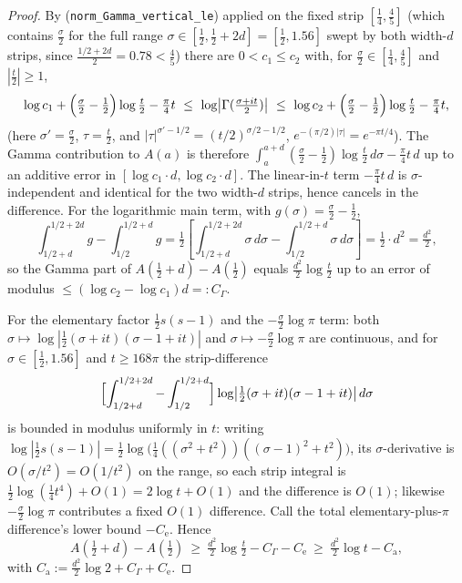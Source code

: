 \begin{proof}
\leanok
{}
By  (\texttt{norm\_Gamma\_vertical\_le}) applied on the
fixed strip $[\tfrac14,\tfrac45]$ (which contains $\tfrac\sigma2$ for the full range
$\sigma\in[\tfrac12,\tfrac12+2d]=[\tfrac12,1.56]$ swept by both width-$d$ strips, since
$\tfrac{1/2+2d}2=0.78<\tfrac45$)
there are $0<c_1\le c_2$ with, for $\tfrac{\sigma}2\in[\tfrac14,\tfrac45]$ and
$|\tfrac t2|\ge1$,
\[
  \log c_1+\Bigl(\tfrac\sigma2-\tfrac12\Bigr)\log\tfrac t2-\tfrac\pi4 t
  \ \le\ \log\bigl|\Gamma(\tfrac{\sigma+it}2)\bigr|
  \ \le\ \log c_2+\Bigl(\tfrac\sigma2-\tfrac12\Bigr)\log\tfrac t2-\tfrac\pi4 t,
\]
(here $\sigma'=\tfrac\sigma2$, $\tau=\tfrac t2$, and $|\tau|^{\sigma'-1/2}
=(t/2)^{\sigma/2-1/2}$, $e^{-(\pi/2)|\tau|}=e^{-\pi t/4}$). The Gamma contribution to
$A(a)$ is therefore $\int_a^{a+d}(\tfrac\sigma2-\tfrac12)\log\tfrac t2\,d\sigma
-\tfrac\pi4 t\,d$ up to an additive error in $[\log c_1\cdot d,\log c_2\cdot d]$. The
linear-in-$t$ term $-\tfrac\pi4 t\,d$ is $\sigma$-independent and identical for the two
width-$d$ strips, hence cancels in the difference. For the logarithmic main term, with
$g(\sigma)=\tfrac\sigma2-\tfrac12$,
\[
  \int_{1/2+d}^{1/2+2d}g-\int_{1/2}^{1/2+d}g
  =\tfrac12\!\left[\int_{1/2+d}^{1/2+2d}\sigma\,d\sigma-\int_{1/2}^{1/2+d}\sigma\,d\sigma\right]
  =\tfrac12\cdot d^2=\tfrac{d^2}2,
\]
so the Gamma part of $A(\tfrac12+d)-A(\tfrac12)$ equals $\tfrac{d^2}2\log\tfrac t2$ up to
an error of modulus $\le(\log c_2-\log c_1)d=:C_\Gamma$.

For the elementary factor $\tfrac12 s(s-1)$ and the $-\tfrac\sigma2\log\pi$ term: both
$\sigma\mapsto\log|\tfrac12(\sigma+it)(\sigma-1+it)|$ and $\sigma\mapsto-\tfrac\sigma2\log\pi$
are continuous, and for $\sigma\in[\tfrac12,1.56]$ and $t\ge168\pi$ the strip-difference
\[
  \Bigl[\int_{1/2+d}^{1/2+2d}-\int_{1/2}^{1/2+d}\Bigr]
    \log\bigl|\tfrac12(\sigma+it)(\sigma-1+it)\bigr|\,d\sigma
\]
is bounded in modulus uniformly in $t$: writing $\log|\tfrac12 s(s-1)|
=\tfrac12\log\bigl(\tfrac14((\sigma^2+t^2))((\sigma-1)^2+t^2)\bigr)$, its $\sigma$-derivative
is $O(\sigma/t^2)=O(1/t^2)$ on the range, so each strip integral is
$\tfrac12\log(\tfrac14 t^4)+O(1)=2\log t+O(1)$ and the difference is $O(1)$; likewise
$-\tfrac\sigma2\log\pi$ contributes a fixed $O(1)$ difference. Call the total
elementary-plus-$\pi$ difference's lower bound $-C_{\mathrm e}$. Hence
\[
  A\!\left(\tfrac12+d\right)-A\!\left(\tfrac12\right)
  \ \ge\ \tfrac{d^2}2\log\tfrac t2-C_\Gamma-C_{\mathrm e}
  \ \ge\ \tfrac{d^2}2\log t-C_{\mathrm a},
\]
with $C_{\mathrm a}:=\tfrac{d^2}2\log2+C_\Gamma+C_{\mathrm e}$.
\end{proof}

